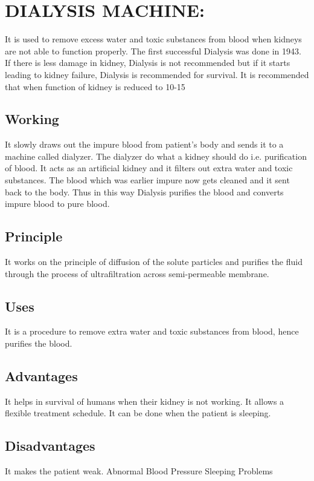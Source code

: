\documentclass[12pt]{article}
\begin{document}
\tableofcontents


\section{DIALYSIS  MACHINE:}
It is used to remove excess water and toxic substances from blood when kidneys are not able to function properly. The first successful Dialysis was done in 1943. If there is less damage in kidney, Dialysis is not recommended but if it starts leading to kidney failure, Dialysis is recommended for survival. It is recommended that when function of kidney is reduced to 10-15%






\subsection{Working}
It slowly draws out the impure blood from patient’s body and sends it to a machine called dialyzer. The dialyzer do what a kidney should do i.e. purification of blood. It acts as an artificial kidney and it filters out extra water and toxic substances. The blood which was earlier impure now gets cleaned and it sent back to the body. Thus in this way Dialysis purifies the blood and converts impure blood to pure blood.


\subsection{Principle}
It works on the principle of diffusion of the solute particles and purifies the fluid through the process of ultrafiltration across semi-permeable membrane.



\subsection{Uses}
It is a procedure to remove extra water and toxic substances from blood, hence purifies the blood.


\subsection{Advantages}

It helps in survival of humans when their kidney is not working.
It allows a flexible treatment schedule.
It can be done when the patient is sleeping.


\subsection{Disadvantages}
It makes the patient weak.
Abnormal Blood Pressure
Sleeping Problems
\end{document}
